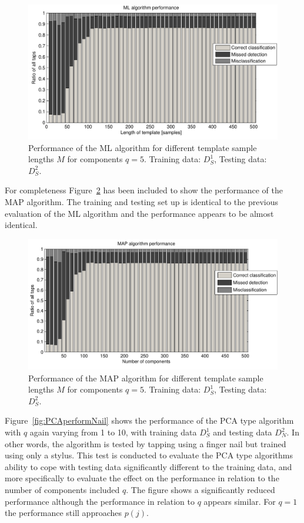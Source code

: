\begin{figure}[!] %
\centering
\includegraphics[width=150mm]{MLperform.pdf}
\caption{Performance of the ML algorithm for different template sample lengths $M$ for components $q=5$. Training data: $D^1_S$, Testing data: $D^2_S$.}\label{fig:MLperform}
\end{figure}

For completeness Figure~\ref{fig:MAPperformLength} has been included to show the performance of the MAP algorithm. The training and testing set up is identical to the previous evaluation of the ML algorithm and the performance appears to be almost identical.

\begin{figure}[!] %
\centering
\includegraphics[width=150mm]{MAPperformLength.pdf}
\caption{Performance of the MAP algorithm for different template sample lengths $M$ for components $q=5$. Training data: $D^1_S$, Testing data: $D^2_S$.}\label{fig:MAPperformLength}
\end{figure}

Figure~\ref{fig:PCAperformNail} shows the performance of the PCA type algorithm with $q$ again varying from 1 to 10, with training data $D^1_S$ and testing data $D^2_N$. In other words, the algorithm is tested by tapping using a finger nail but trained using only a stylus. This test is conducted to evaluate the PCA type algorithms ability to cope with testing data significantly different to the training data, and more specifically to evaluate the effect on the performance in relation to the number of components included $q$. The figure shows a significantly reduced performance although the performance in relation to $q$ appears similar. For $q=1$ the performance still approaches $p(j)$.


